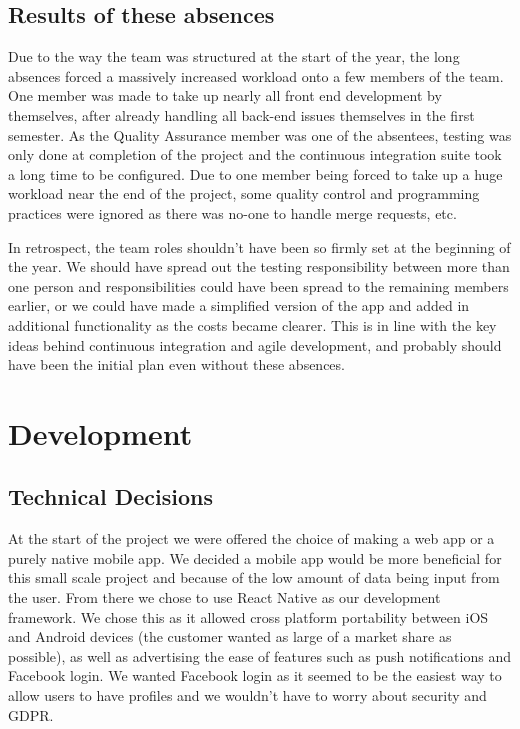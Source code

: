 \documentclass{l3proj}
\begin{document}
\subsection{Results of these absences}
Due to the way the team was structured at the start of the year, the long absences forced a massively increased workload onto a few members of the team. One member was made to take up nearly all front end development by themselves, after already handling all back-end issues themselves in the first semester. As the Quality Assurance member was one of the absentees, testing was only done at completion of the project and the continuous integration suite took a long time to be configured. Due to one member being forced to take up a huge workload near the end of the project, some quality control and programming practices were ignored as there was no-one to handle merge requests, etc.

In retrospect, the team roles shouldn't have been so firmly set at the beginning of the year. We should have spread out the testing responsibility between more than one person and responsibilities could have been spread to the remaining members earlier, or we could have made a simplified version of the app and added in additional functionality as the costs became clearer. This is in line with the key ideas behind continuous integration \cite{ci} and agile development, and probably should have been the initial plan even without these absences. 


\section{Development}
\label{sec:development}

\subsection{Technical Decisions}
At the start of the project we were offered the choice of making a web app or a purely native mobile app. We decided a mobile app would be more beneficial for this small scale project and because of the low amount of data being input from the user. From there we chose to use React Native as our development framework. We chose this as it allowed cross platform portability between iOS and Android devices (the customer wanted as large of a market share as possible), as well as advertising the ease of features such as push notifications and Facebook login. We wanted Facebook login as it seemed to be the easiest way to allow users to have profiles and we wouldn't have to worry about security and GDPR.
\end{document}
